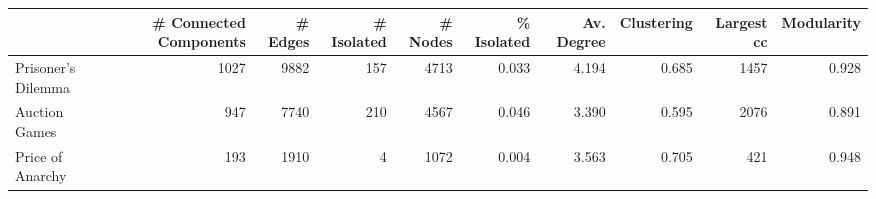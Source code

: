 \begin{tabular}{lrrrrrrrrr}
\toprule
{} &  \# Connected Components &  \# Edges &  \# Isolated &  \# Nodes &  \% Isolated &  Av. Degree &  Clustering &  Largest cc &  Modularity \\
\midrule
Prisoner's Dilemma &                    1027 &     9882 &         157 &     4713 &       0.033 &       4.194 &       0.685 &        1457 &       0.928 \\
Auction Games      &                     947 &     7740 &         210 &     4567 &       0.046 &       3.390 &       0.595 &        2076 &       0.891 \\
Price of Anarchy   &                     193 &     1910 &           4 &     1072 &       0.004 &       3.563 &       0.705 &         421 &       0.948 \\
\bottomrule
\end{tabular}
